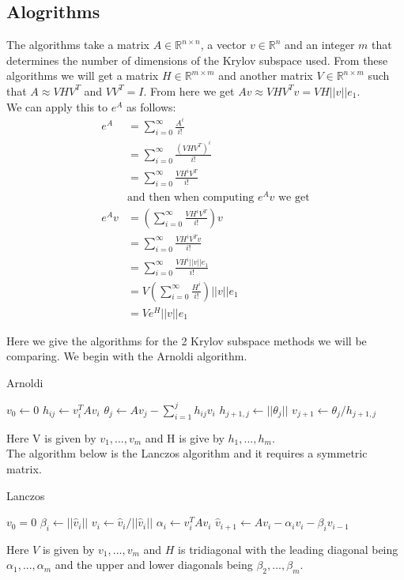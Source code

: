 \documentclass{article}
\begin{document}
\subsection{Alogrithms}
The algorithms take a matrix $A\in \mathbb{R}^{n\times n}$, a vector $v \in \mathbb{R}^n$ and an integer $m$ that determines the number of dimensions of the Krylov subspace used.
From these algorithms we will get a matrix $H \in \mathbb{R}^{m\times m}$ and another matrix $V \in \mathbb{R}^{n\times m}$ such that $A \approx VHV^T$ and $VV^T = I$.
From here we get $Av \approx VHV^Tv = VH||v||e_1$.\\
We can apply this to $e^A$ as follows:
\begin{align*}
e^A &= \sum^{\infty}_{i=0}\frac{A^i}{i!}\\
&= \sum^{\infty}_{i=0}\frac{(VHV^T)^i}{i!} \\
&= \sum^{\infty}_{i=0}\frac{VH^iV^T}{i!} \\
&\text {and then when computing $e^Av$ we get}\\
e^Av &= (\sum^{\infty}_{i=0}\frac{VH^iV^T}{i!})v \\
&= \sum^{\infty}_{i=0}\frac{VH^iV^Tv}{i!} \\
&= \sum^{\infty}_{i=0}\frac{VH^i||v||e_1}{i!} \\
&= V(\sum^{\infty}_{i=0}\frac{H^i}{i!})||v||e_1 \\
&= Ve^H||v||e_1
\end{align*}

Here we give the algorithms for the 2 Krylov subspace methods we will be comparing.
We begin with the Arnoldi algorithm.


\begin{algorithm}[H]
\caption{Arnoldi \cite{Fan2018}} %
\begin{algorithmic}
\State $v_0 \gets 0$
\State$h_{ij} \gets v_i^T A v_i$
\EndFor
\State$\theta_j \gets Av_j - \sum^j_{i=1} h_{ij}v_i$
\State$h_{j+1,j} \gets ||\theta_j||$
\State$v_{j+1} \gets \theta_j/h_{j+1,j}$
\EndFor
\EndProcedure
\end{algorithmic}
\end{algorithm}
Here V is given by $v_1,...,v_m$ and H is give by $h_1,...,h_m$.\\
The algorithm below is the Lanczos algorithm and it requires a symmetric matrix. \cite{Moler2003}
\begin{algorithm}[H]
\caption{Lanczos \cite{OJALVO1970}}
\begin{algorithmic}
\State $v_0 = 0$
\State$\beta_i \gets || \hat v_i ||$
\State$v_i \gets \hat v_i / || \hat v_i ||$
\State$\alpha_i \gets v_i^T A v_i$
\State$\hat v_{i+1} \gets Av_i - \alpha_iv_i - \beta_iv_{i-1}$
\EndFor
\EndProcedure
\end{algorithmic}
\end{algorithm}
Here $V$ is given by ${v_1,...,v_m}$ and $H$ is tridiagonal with the leading diagonal being $\alpha_1, ..., \alpha_m$ and the upper and lower diagonals being $\beta_2,...,\beta_m$.
\end{document}

